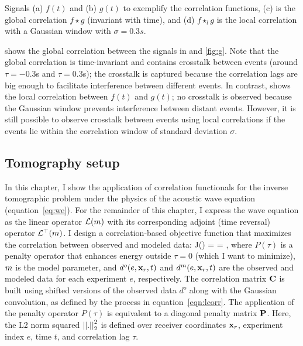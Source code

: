  {Signals
(a) $f(t)$ and (b) $g(t)$ to exemplify the correlation functions, (c) is the
global correlation $f\star g$ (invariant with time), and (d) $f\star_l g$ is
the local correlation with a Gaussian window with $\sigma=0.3s$.}





 shows the global correlation between the signals in  and
\ref{fig:g}. Note that the global correlation is time-invariant and contains
crosstalk between events (around $\tau=-0.3$s and $\tau=0.3$s); the crosstalk is
captured because the correlation lags are big enough to facilitate interference
between different events. In contrast,  shows the local correlation
between $f(t)$ and $g(t)$; no crosstalk is observed because the Gaussian
window prevents interference between distant events. However, it 
is still possible to observe crosstalk between events using local correlations if the events
lie within the correlation window of standard deviation $\sigma$.

\subsection{Tomography setup}

In this chapter, I  show the application of correlation functionals for the 
inverse tomographic problem under the physics of the acoustic wave equation (equation~\ref{eq:we}).
 For the remainder of this chapter, I 
express the wave equation as the linear operator ${\mathcal{L}}(m)$ with its corresponding
adjoint (time reversal) operator ${\mathcal{L}}^\top(m)$.
 I design a correlation-based objective
function that maximizes the correlation between observed and modeled data:
\beq
  J(\m) = 
           {}=
          ,
  \label{eqn:of}
\eeq
where $P(\tau)$ is a penalty operator that enhances energy outside $\tau=0$
(which I want to minimize), $m$ is the model parameter, and $d^o(e,{\bf x}_r,t)$
and $d^m(e,{\bf x}_r,t)$ are the observed and modeled data for each experiment $e$,
respectively. The correlation matrix $\bf C$ is built using shifted versions
of the observed data $d^o$ along with the Gaussian convolution, as defined
by the process in equation~\ref{eqn:lcorr}. The application of the penalty
operator $P(\tau)$ is equivalent to a diagonal penalty matrix $\bf P$. Here,
the L2 norm squared $\left|\left|.\right|\right|^{2}_{2}$ is defined over receiver coordinates ${\bf x}_r$,
experiment index $e$, time $t$, and correlation lag $\tau$.

